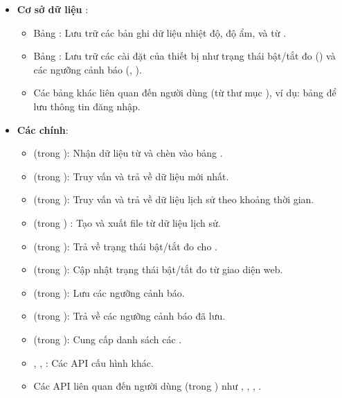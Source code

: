 \begin{itemize}
	\item \textbf{Cơ sở dữ liệu }:
	\begin{itemize}
		\item Bảng : Lưu trữ các bản ghi dữ liệu nhiệt độ, độ ẩm,  và  từ .
		\item Bảng : Lưu trữ các cài đặt của thiết bị như trạng thái bật/tắt đo () và các ngưỡng cảnh báo (, ).
		\item Các bảng khác liên quan đến người dùng (từ thư mục ), ví dụ: bảng  để lưu thông tin đăng nhập.
	\end{itemize}
	\item \textbf{Các   chính}:
	\begin{itemize}
		\item {} (trong ): Nhận dữ liệu  từ  và chèn vào bảng .
		\item {} (trong ): Truy vấn và trả về dữ liệu mới nhất.
		\item {} (trong ): Truy vấn và trả về dữ liệu lịch sử theo khoảng thời gian.
		\item {} (trong ) : Tạo và xuất file  từ dữ liệu lịch sử.
		\item {} (trong ): Trả về trạng thái bật/tắt đo cho .
		\item {} (trong ): Cập nhật trạng thái bật/tắt đo từ giao diện web.
		\item {} (trong ): Lưu các ngưỡng cảnh báo.
		\item {} (trong ): Trả về các ngưỡng cảnh báo đã lưu.
		\item {} (trong ): Cung cấp danh sách các .
		\item {}, , : Các API cấu hình khác.
		\item Các API liên quan đến người dùng (trong ) như , , , .
	\end{itemize}
\end{itemize}

